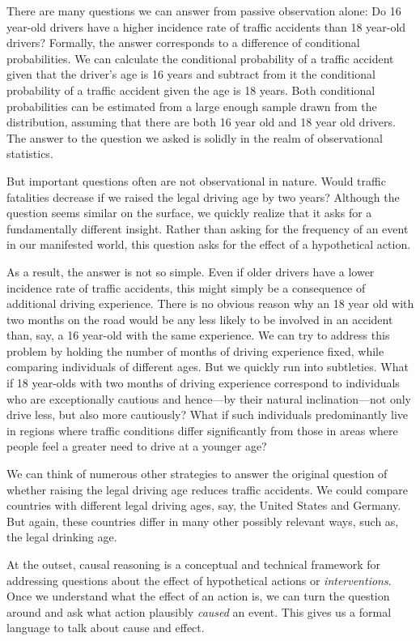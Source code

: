 \documentclass{tufte-book}
\begin{document}
There are many questions we can answer from passive observation alone:
Do 16 year-old drivers have a higher incidence rate of traffic accidents
than 18 year-old drivers? Formally, the answer corresponds to a
difference of conditional probabilities. We can calculate the
conditional probability of a traffic accident given that the driver's
age is 16 years and subtract from it the conditional probability of a
traffic accident given the age is 18 years. Both conditional
probabilities can be estimated from a large enough sample drawn from the
distribution, assuming that there are both 16 year old and 18 year old
drivers. The answer to the question we asked is solidly in the realm of
observational statistics.

But important questions often are not observational in nature. Would
traffic fatalities decrease if we raised the legal driving age by two
years? Although the question seems similar on the surface, we quickly
realize that it asks for a fundamentally different insight. Rather than
asking for the frequency of an event in our manifested world, this
question asks for the effect of a hypothetical action.

As a result, the answer is not so simple. Even if older drivers have a
lower incidence rate of traffic accidents, this might simply be a
consequence of additional driving experience. There is no obvious reason
why an 18 year old with two months on the road would be any less likely
to be involved in an accident than, say, a 16 year-old with the same
experience. We can try to address this problem by holding the number of
months of driving experience fixed, while comparing individuals of
different ages. But we quickly run into subtleties. What if 18 year-olds
with two months of driving experience correspond to individuals who are
exceptionally cautious and hence---by their natural inclination---not
only drive less, but also more cautiously? What if such individuals
predominantly live in regions where traffic conditions differ
significantly from those in areas where people feel a greater need to
drive at a younger age?

We can think of numerous other strategies to answer the original
question of whether raising the legal driving age reduces traffic
accidents. We could compare countries with different legal driving ages,
say, the United States and Germany. But again, these countries differ in
many other possibly relevant ways, such as, the legal drinking age.

At the outset, causal reasoning is a conceptual and technical framework
for addressing questions about the effect of hypothetical actions or
\emph{interventions}. Once we understand what the effect of an action
is, we can turn the question around and ask what action plausibly
\emph{caused} an event. This gives us a formal language to talk about
cause and effect.
\end{document}
